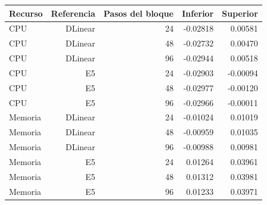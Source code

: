 \begin{tabular}{lrrrr}
\toprule
Recurso & Referencia & Pasos del bloque & Inferior & Superior \\
\midrule
CPU & DLinear & 24 & -0.02818 & 0.00581 \\
CPU & DLinear & 48 & -0.02732 & 0.00470 \\
CPU & DLinear & 96 & -0.02944 & 0.00518 \\
CPU & E5 & 24 & -0.02903 & -0.00094 \\
CPU & E5 & 48 & -0.02977 & -0.00120 \\
CPU & E5 & 96 & -0.02966 & -0.00011 \\
Memoria & DLinear & 24 & -0.01024 & 0.01019 \\
Memoria & DLinear & 48 & -0.00959 & 0.01035 \\
Memoria & DLinear & 96 & -0.00988 & 0.00981 \\
Memoria & E5 & 24 & 0.01264 & 0.03961 \\
Memoria & E5 & 48 & 0.01312 & 0.03981 \\
Memoria & E5 & 96 & 0.01233 & 0.03971 \\
\bottomrule
\end{tabular}

